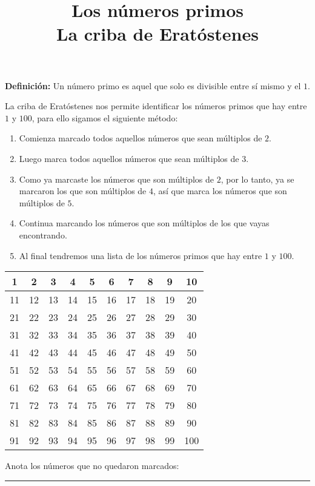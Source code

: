 

\title{Los números primos \\ {\Large La criba de Eratóstenes}\vspace{-3ex}}
\author{}
\date{ }



\maketitle
\fontsize{14}{14}\selectfont

\textbf{Definición:} Un número primo es aquel que solo es divisible entre sí mismo y el $1$.
\par
La criba de Eratóstenes nos permite identificar los números primos que hay entre $1$ y $100$, para ello sigamos el siguiente método:
\begin{enumerate}
\item Comienza marcado todos aquellos números que sean múltiplos de $2$.
\item Luego marca todos aquellos números que sean múltiplos de $3$.
\item Como ya marcaste los números que son múltiplos de $2$, por lo tanto, ya se marcaron los que son múltiplos de $4$, así que marca los números que son múltiplos de $5$.
\item Continua marcando los números que son múltiplos de los que vayas encontrando.
\item Al final tendremos una lista de los números primos que hay entre $1$ y $100$.
\end{enumerate}

\newpage

\begin{table}
\centering
\Large
\begin{tabular}{| c  | c | c  | c | c  | c | c  | c | c  | c |}
\hline
1 & 2 & 3 & 4 & 5 & 6 & 7 & 8 & 9 & 10 \\ \hline
11 & 12 & 13 & 14 & 15 & 16 & 17 & 18 & 19 & 20 \\ \hline
21 & 22 & 23 & 24 & 25 & 26 & 27 & 28 & 29 & 30 \\ \hline
31 & 32 & 33 & 34 & 35 & 36 & 37 & 38 & 39 & 40 \\ \hline
41 & 42 & 43 & 44 & 45 & 46 & 47 & 48 & 49 & 50 \\ \hline
51 & 52 & 53 & 54 & 55 & 56 & 57 & 58 & 59 & 60 \\ \hline
61 & 62 & 63 & 64 & 65 & 66 & 67 & 68 & 69 & 70 \\ \hline
71 & 72 & 73 & 74 & 75 & 76 & 77 & 78 & 79 & 80 \\ \hline
81 & 82 & 83 & 84 & 85 & 86 & 87 & 88 & 89 & 90 \\ \hline
91 & 92 & 93 & 94 & 95 & 96 & 97 & 98 & 99 & 100 \\ \hline
\end{tabular}
\end{table}
\vspace*{1em}
Anota los números que no quedaron marcados:
\\[0.5em]
\rule{14cm}{0.1mm}


